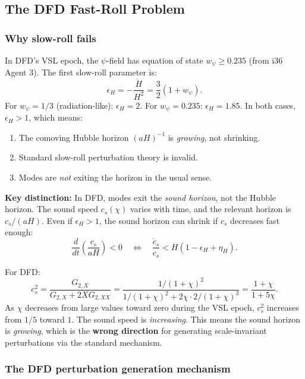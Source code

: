 \documentclass[11pt,a4paper]{article}
\begin{document}
\subsection{The DFD Fast-Roll Problem}

\subsubsection{Why slow-roll fails}

In DFD's VSL epoch, the $\psi$-field has equation of state $w_\psi \geq 0.235$ (from i36 Agent 3). The first slow-roll parameter is:
\begin{equation}
\epsilon_H = -\frac{\dot{H}}{H^2} = \frac{3}{2}(1 + w_\psi).
\end{equation}
For $w_\psi = 1/3$ (radiation-like): $\epsilon_H = 2$. For $w_\psi = 0.235$: $\epsilon_H = 1.85$. In both cases, $\epsilon_H > 1$, which means:
\begin{enumerate}
\item The comoving Hubble horizon $(aH)^{-1}$ is \emph{growing}, not shrinking.
\item Standard slow-roll perturbation theory is invalid.
\item Modes are \emph{not} exiting the horizon in the usual sense.
\end{enumerate}

\textbf{Key distinction:} In DFD, modes exit the \emph{sound horizon}, not the Hubble horizon. The sound speed $c_s(\chi)$ varies with time, and the relevant horizon is $c_s/(aH)$. Even if $\epsilon_H > 1$, the sound horizon can shrink if $c_s$ decreases fast enough:
\begin{equation}\label{eq:sound-horizon}
\frac{d}{dt}\left(\frac{c_s}{aH}\right) < 0 \quad \Leftrightarrow \quad \frac{\dot{c}_s}{c_s} < H(1 - \epsilon_H + \eta_H).
\end{equation}

For DFD:
\begin{equation}
c_s^2 = \frac{G_{2,X}}{G_{2,X} + 2X G_{2,XX}} = \frac{1/(1+\chi)^2}{1/(1+\chi)^2 + 2\chi \cdot 2/(1+\chi)^3} = \frac{1+\chi}{1 + 5\chi}.
\end{equation}
As $\chi$ decreases from large values toward zero during the VSL epoch, $c_s^2$ increases from $1/5$ toward $1$. The sound speed is \emph{increasing}. This means the sound horizon is \emph{growing}, which is the \textbf{wrong direction} for generating scale-invariant perturbations via the standard mechanism.

\subsubsection{The DFD perturbation generation mechanism}
\end{document}
